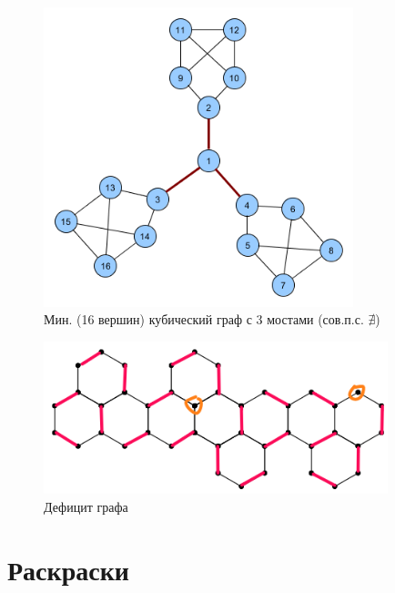 \documentclass[a4paper,12pt]{article}
\theoremstyle{remark}
\begin{document}
\begin{figure}[H]
	\centering
	\includegraphics[width=9cm]{minimum-cubic-graph-with3-bridges.png}
	\caption{Мин. (16 вершин) кубический граф с 3 мостами (сов.п.с. $\nexists$)}
\end{figure}

\begin{figure}[H]
	\centering
	\includegraphics[width=10cm]{matching-deficit-2.png}
	\caption{Дефицит графа}
\end{figure}




\section{Раскраски}
\end{document}
